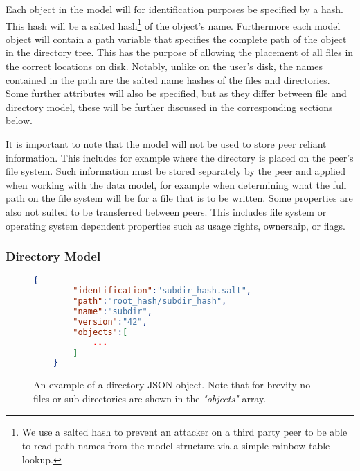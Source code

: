 Each object in the model will for identification purposes be specified by a hash.
This hash will be a salted hash\footnote{We use a salted hash to prevent an attacker on a third party peer to be able to read path names from the model structure via a simple rainbow table lookup.} of the object's name.
Furthermore each model object will contain a path variable that specifies the complete path of the object in the directory tree.
This has the purpose of allowing the placement of all files in the correct locations on disk.
Notably, unlike on the user's disk, the names contained in the path are the salted name hashes of the files and directories.
Some further attributes will also be specified, but as they differ between file and directory model, these will be further discussed in the corresponding sections below.

It is important to note that the model will not be used to store peer reliant information.
This includes for example where the directory is placed on the peer's file system.
Such information must be stored separately by the peer and applied when working with the data model, for example when determining what the full path on the file system will be for a file that is to be written.
Some properties are also not suited to be transferred between peers.
This includes file system or operating system dependent properties such as usage rights, ownership, or flags.

\subsubsection{Directory Model}
\label{sec:dir_model}

\begin{figure}[htp]
    \begin{lstlisting}[language=json,firstnumber=0]
    {
        "identification":"subdir_hash.salt",
        "path":"root_hash/subdir_hash",
        "name":"subdir",
        "version":"42",
        "objects":[
            ...
        ]
    }
    \end{lstlisting}
\caption[Directory JSON Model]{An example of a directory JSON object. Note that for brevity no files or sub directories are shown in the \textit{"objects"} array.}
\label{json:directory_model}
\end{figure}

